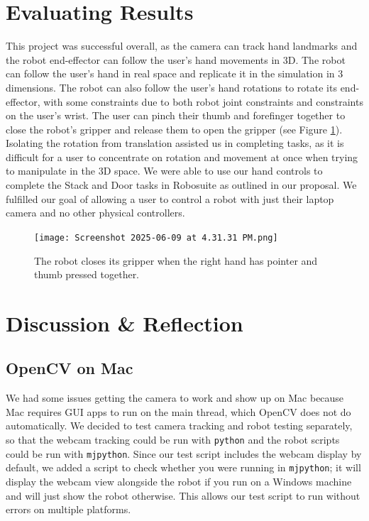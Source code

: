 \documentclass{article}
\begin{document}
\section{Evaluating Results}
\label{sec:result}
This project was successful overall, as the camera can track hand landmarks and the robot end-effector can follow the user’s hand movements in 3D. The robot can follow the user’s hand in real space and replicate it in the simulation in 3 dimensions. The robot can also follow the user’s hand rotations to rotate its end-effector, with some constraints due to both robot joint constraints and constraints on the user’s wrist. The user can pinch their thumb and forefinger together to close the robot’s gripper and release them to open the gripper (see Figure \ref{fig:fist-rotation}). Isolating the rotation from translation assisted us in completing tasks, as it is difficult for a user to concentrate on rotation and movement at once when trying to manipulate in the 3D space. We were able to use our hand controls to complete the Stack and Door tasks in Robosuite as outlined in our proposal. We fulfilled our goal of allowing a user to control a robot with just their laptop camera and no other physical controllers.
\begin{figure}[H]
  \centering
  \texttt{[image: Screenshot 2025-06-09 at 4.31.31 PM.png]}
  \caption{The robot closes its gripper when the right hand has pointer and thumb pressed together.  }
  \label{fig:fist-rotation}
\end{figure}

\section{Discussion \& Reflection}
\label{sec:conclusion}
\subsection{OpenCV on Mac}
We had some issues getting the camera to work and show up on Mac because Mac requires GUI apps to run on the main thread, which OpenCV does not do automatically. We decided to test camera tracking and robot testing separately, so that the webcam tracking could be run with \texttt{python} and the robot scripts could be run with \texttt{mjpython}. Since our test script includes the webcam display by default, we added a script to check whether you were running in \texttt{mjpython}; it will display the webcam view alongside the robot if you run on a Windows machine and will just show the robot otherwise. This allows our test script to run without errors on multiple platforms.
\end{document}
